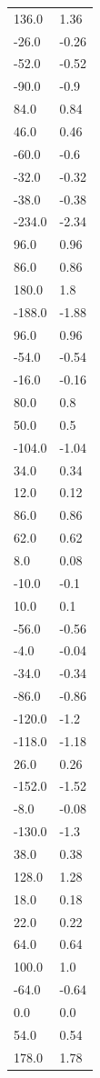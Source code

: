 \begin{longtable}{ll}
136.0 & 1.36 \\
-26.0 & -0.26 \\
-52.0 & -0.52 \\
-90.0 & -0.9 \\
84.0 & 0.84 \\
46.0 & 0.46 \\
-60.0 & -0.6 \\
-32.0 & -0.32 \\
-38.0 & -0.38 \\
-234.0 & -2.34 \\
96.0 & 0.96 \\
86.0 & 0.86 \\
180.0 & 1.8 \\
-188.0 & -1.88 \\
96.0 & 0.96 \\
-54.0 & -0.54 \\
-16.0 & -0.16 \\
80.0 & 0.8 \\
50.0 & 0.5 \\
-104.0 & -1.04 \\
34.0 & 0.34 \\
12.0 & 0.12 \\
86.0 & 0.86 \\
62.0 & 0.62 \\
8.0 & 0.08 \\
-10.0 & -0.1 \\
10.0 & 0.1 \\
-56.0 & -0.56 \\
-4.0 & -0.04 \\
-34.0 & -0.34 \\
-86.0 & -0.86 \\
-120.0 & -1.2 \\
-118.0 & -1.18 \\
26.0 & 0.26 \\
-152.0 & -1.52 \\
-8.0 & -0.08 \\
-130.0 & -1.3 \\
38.0 & 0.38 \\
128.0 & 1.28 \\
18.0 & 0.18 \\
22.0 & 0.22 \\
64.0 & 0.64 \\
100.0 & 1.0 \\
-64.0 & -0.64 \\
0.0 & 0.0 \\
54.0 & 0.54 \\
178.0 & 1.78 \\

\end{longtable}
